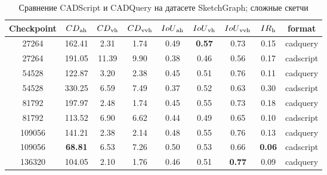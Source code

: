 \begin{table}[ht]
	\centering
	\caption{Сравнение CADScript и CADQuery на датасете SketchGraph; сложные скетчи}
	\begin{tabular}{c c c c c c c c c}
		\hline
		\textbf{Checkpoint} & $CD\textsubscript{ah}$ & $CD\textsubscript{vh}$ & $CD\textsubscript{vvh}$ & $IoU\textsubscript{ah}$ & $IoU\textsubscript{vh}$ & $IoU\textsubscript{vvh}$ & $IR\textsubscript{h}$ & format    \\
		\hline
		27264               & 162.41                 & 2.31                   & 1.74                    & 0.49                    & \textbf{0.57}           & 0.73                     & 0.15                  & cadquery  \\
		27264               & 191.05                 & 11.39                  & 9.90                    & 0.38                    & 0.46                    & 0.56                     & 0.17                  & cadscript \\
		54528               & 122.87                 & 3.20                   & 2.38                    & 0.45                    & 0.51                    & 0.76                     & 0.11                  & cadquery  \\
		54528               & 330.25                 & 6.59                   & 7.49                    & 0.37                    & 0.52                    & 0.63                     & 0.30                  & cadscript \\
		81792               & 197.97                 & 2.48                   & 1.74                    & 0.45                    & 0.55                    & 0.73                     & 0.18                  & cadquery  \\
		81792               & 113.52                 & 6.90                   & 6.62                    & 0.44                    & 0.49                    & 0.65                     & 0.10                  & cadscript \\
		109056              & 141.21                 & 2.38                   & 2.14                    & 0.48                    & 0.55                    & 0.76                     & 0.13                  & cadquery  \\
		109056              & \textbf{68.81}         & 6.53                   & 7.26                    & 0.50                    & 0.53                    & 0.66                     & \textbf{0.06}         & cadscript \\
		136320              & 104.05                 & 2.10                   & 1.76                    & 0.46                    & 0.51                    & \textbf{0.77}            & 0.09                  & cadquery  \\

\end{tabular}
\end{table}
